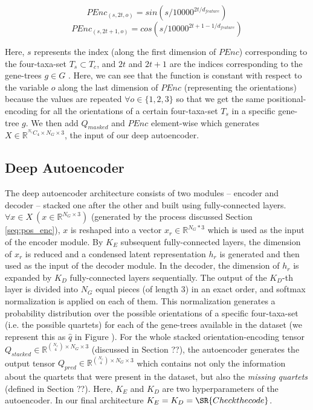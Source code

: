 \begin{equation}
\label{eq:pos_enc_even}
PEnc_{(s, 2t, o)} = sin{(s/{10000^{2t/d_{feature}}})}
\end{equation}
\begin{equation}
\label{eq:pos_enc_odd}
PEnc_{(s, 2t+1, o)} = cos{(s/{10000^{2t+1-1/d_{feature}}})}
\end{equation}

Here, $s$ represents the index (along the first dimension of $PEnc$) corresponding to the four-taxa-set $T_s \subset T_c$, and $2t$ and $2t+1$ are the indices corresponding to the gene-trees $g \in G$ . Here, we can see that the function is constant with respect to the variable $o$ along the last dimension of $PEnc$ (representing the orientations) because the values are repeated $\forall o \in \{1,2,3\}$ 
so that we get the same positional-encoding for all the orientations of a certain four-taxa-set $T_s$ in a specific gene-tree $g$. We then add $Q_{masked}$ and $PEnc$ element-wise which generates $X \in \mathbb{R}^{^{N_c}C_{4} \times N_G \times 3}$, the input of our deep autoencoder. 


\subsection{Deep Autoencoder}
The deep autoencoder architecture consists of two modules -- encoder and decoder -- stacked one after the other and built using fully-connected layers\SR{[cite]}. $\forall x \in X~(x \in \mathbb{R}^{N_G \times 3})$ (generated by the process discussed Section \ref{seq:pos_enc}), $x$ is reshaped into a vector $x_r \in \mathbb{R}^{N_G * 3}$ which is used as the input of the encoder module. By $K_E$ subsequent fully-connected layers, the dimension of $x_r$ is reduced and a condensed latent representation $h_r$ is generated and then used as the input of the decoder module. In the decoder, the dimension of $h_r$ is expanded by $K_D$ fully-connected layers sequentially. The output of the $K_D$-th layer is divided into $N_G$ equal pieces (of length $3$) in an exact order, and softmax normalization is applied on each of them. This normalization generates a probability distribution over the possible orientations of a specific four-taxa-set (i.e. the possible quartets) for each of the gene-trees available in the dataset (we represent this as $\hat{q}$ in Figure ). For the whole stacked orientation-encoding tensor $Q_{stacked} \in \mathbb{R}^{\binom{N_c}{4} \times N_G \times 3}$ (discussed in Section ??), the autoencoder generates the output tensor $Q_{pred}  \in \mathbb{R}^{\binom{N_c}{4} \times N_G \times 3}$ which contains not only the information about the quartets that were present in the dataset, but also the \textit{missing quartets} (defined in Section ??). Here, $K_E$ and $K_D$ are two hyperparameters of the autoencoder. In our final architecture $K_E=K_D=\SR{Check the code}$. 

